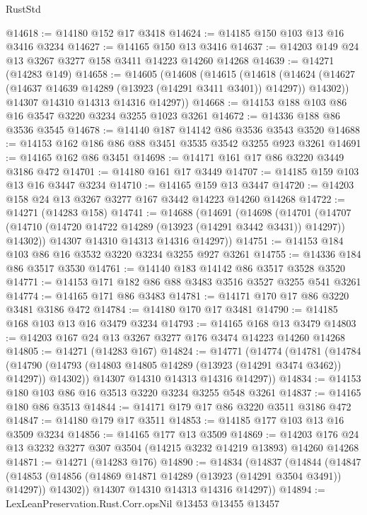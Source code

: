 \begin{lexlean}{RustStd}
\begin{coremodule}
{\begin{coremodule}
{{{{{{{{{{{{{{{{{{{{{{{{{{{{{{{{{{{{{@14618 := @14180 @152 @17 @3418
@14624 := @14185 @150 @103 @13 @16 @3416 @3234
@14627 := @14165 @150 @13 @3416
@14637 := @14203 @149 @24 @13 @3267 @3277 @158 @3411 @14223 @14260 @14268
@14639 := @14271 (@14283 @149)
@14658 := @14605
    (@14608
      (@14615
        (@14618
          (@14624 (@14627 (@14637 @14639 @14289 (@13923 (@14291 @3411 @3401)) @14297)) @14302))
        @14307
        @14310
        @14313
        @14316
        @14297))
@14668 := @14153 @188 @103 @86 @16 @3547 @3220 @3234 @3255 @1023 @3261
@14672 := @14336 @188 @86 @3536 @3545
@14678 := @14140 @187 @14142 @86 @3536 @3543 @3520
@14688 := @14153 @162 @186 @86 @88 @3451 @3535 @3542 @3255 @923 @3261
@14691 := @14165 @162 @86 @3451
@14698 := @14171 @161 @17 @86 @3220 @3449 @3186 @472
@14701 := @14180 @161 @17 @3449
@14707 := @14185 @159 @103 @13 @16 @3447 @3234
@14710 := @14165 @159 @13 @3447
@14720 := @14203 @158 @24 @13 @3267 @3277 @167 @3442 @14223 @14260 @14268
@14722 := @14271 (@14283 @158)
@14741 := @14688
    (@14691
      (@14698
        (@14701
          (@14707 (@14710 (@14720 @14722 @14289 (@13923 (@14291 @3442 @3431)) @14297)) @14302))
        @14307
        @14310
        @14313
        @14316
        @14297))
@14751 := @14153 @184 @103 @86 @16 @3532 @3220 @3234 @3255 @927 @3261
@14755 := @14336 @184 @86 @3517 @3530
@14761 := @14140 @183 @14142 @86 @3517 @3528 @3520
@14771 := @14153 @171 @182 @86 @88 @3483 @3516 @3527 @3255 @541 @3261
@14774 := @14165 @171 @86 @3483
@14781 := @14171 @170 @17 @86 @3220 @3481 @3186 @472
@14784 := @14180 @170 @17 @3481
@14790 := @14185 @168 @103 @13 @16 @3479 @3234
@14793 := @14165 @168 @13 @3479
@14803 := @14203 @167 @24 @13 @3267 @3277 @176 @3474 @14223 @14260 @14268
@14805 := @14271 (@14283 @167)
@14824 := @14771
    (@14774
      (@14781
        (@14784
          (@14790 (@14793 (@14803 @14805 @14289 (@13923 (@14291 @3474 @3462)) @14297)) @14302))
        @14307
        @14310
        @14313
        @14316
        @14297))
@14834 := @14153 @180 @103 @86 @16 @3513 @3220 @3234 @3255 @548 @3261
@14837 := @14165 @180 @86 @3513
@14844 := @14171 @179 @17 @86 @3220 @3511 @3186 @472
@14847 := @14180 @179 @17 @3511
@14853 := @14185 @177 @103 @13 @16 @3509 @3234
@14856 := @14165 @177 @13 @3509
@14869 := @14203 @176 @24 @13 @3232 @3277 @307 @3504 (@14215 @3232 @14219 @13893) @14260 @14268
@14871 := @14271 (@14283 @176)
@14890 := @14834
    (@14837
      (@14844
        (@14847
          (@14853 (@14856 (@14869 @14871 @14289 (@13923 (@14291 @3504 @3491)) @14297)) @14302))
        @14307
        @14310
        @14313
        @14316
        @14297))
@14894 := LexLeanPreservation.Rust.Corr.opsNil @13453 @13455 @13457
}}}}}}}}}}}}}}}}}}}}}}}}}}}}}}}}}}}}}
\end{coremodule}}
\end{coremodule}
\end{lexlean}
